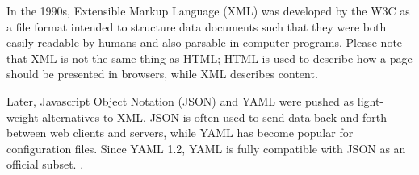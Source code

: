In the 1990s, Extensible Markup Language (XML) was developed by the W3C as a file format intended to structure data documents such that they were both easily readable by humans and also parsable in computer programs. Please note that XML is not the same thing as HTML; HTML is used to describe how a page should be presented in browsers, while XML describes content.


Later, Javascript Object Notation (JSON) and YAML were pushed as light-weight alternatives to XML. JSON is often used to send data back and forth between web clients and servers, while YAML has become popular for configuration files. Since YAML 1.2, YAML is fully compatible with JSON as an official subset. \cite{ben-kiki_evans_net_2009}. 






